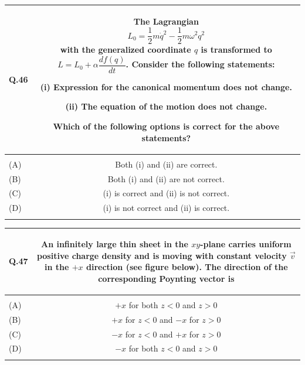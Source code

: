\documentclass[12pt,a4paper]{article}
\begin{document}
\begin{table}[h!]
\begin{tabular}{|L|C|}
\hline
Q.46 &
The Lagrangian
\[
L_0 = \frac{1}{2}m\dot{q}^2 - \frac{1}{2}m\omega^2 q^2
\]
with the generalized coordinate $q$ is transformed to $L = L_0 + \alpha\dfrac{df(q)}{dt}$.
Consider the following statements:

\medskip
(i)\; Expression for the canonical momentum does not change.

(ii) The equation of the motion does not change.

\medskip
Which of the following options is correct for the above statements? \\
\hline
 & \\
\hline
(A) & Both (i) and (ii) are correct. \\
\hline
(B) & Both (i) and (ii) are not correct. \\
\hline
(C) & (i) is correct and (ii) is not correct. \\
\hline
(D) & (i) is not correct and (ii) is correct. \\
\hline
 & \\
\hline
\end{tabular}
\end{table}

\vspace{0.4cm}

\begin{table}[h!]
\begin{tabular}{|L|C|}
\hline
Q.47 &
An infinitely large thin sheet in the $xy$-plane carries uniform positive charge density
and is moving with constant velocity $\vec{v}$ in the $+x$ direction (see figure below).
The direction of the corresponding Poynting vector is

\vspace{0.3cm}
\begin{center}
\end{center}
\\
\hline
 & \\
\hline
(A) & $+x$ for both $z < 0$ and $z > 0$ \\
\hline
(B) & $+x$ for $z < 0$ and $-x$ for $z > 0$ \\
\hline
(C) & $-x$ for $z < 0$ and $+x$ for $z > 0$ \\
\hline
(D) & $-x$ for both $z < 0$ and $z > 0$ \\
\hline
 & \\
\hline
\end{tabular}
\end{table}
\end{document}
